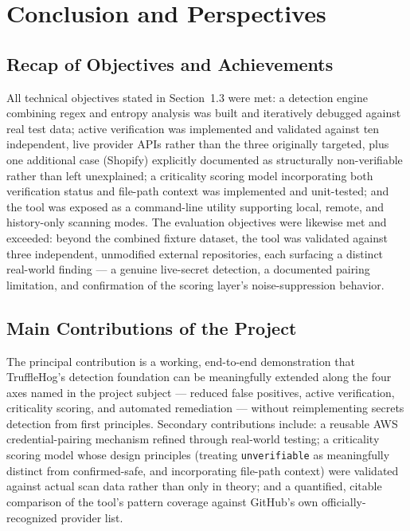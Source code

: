 \documentclass[12pt]{article}
\begin{document}
\newpage

\section{Conclusion and Perspectives}

\subsection{Recap of Objectives and Achievements}

All technical objectives stated in Section~1.3 were met: a detection engine combining regex and entropy analysis was built and iteratively debugged against real test data; active verification was implemented and validated against ten independent, live provider APIs rather than the three originally targeted, plus one additional case (Shopify) explicitly documented as structurally non-verifiable rather than left unexplained; a criticality scoring model incorporating both verification status and file-path context was implemented and unit-tested; and the tool was exposed as a command-line utility supporting local, remote, and history-only scanning modes. The evaluation objectives were likewise met and exceeded: beyond the combined fixture dataset, the tool was validated against three independent, unmodified external repositories, each surfacing a distinct real-world finding --- a genuine live-secret detection, a documented pairing limitation, and confirmation of the scoring layer's noise-suppression behavior.

\subsection{Main Contributions of the Project}

The principal contribution is a working, end-to-end demonstration that TruffleHog's detection foundation can be meaningfully extended along the four axes named in the project subject --- reduced false positives, active verification, criticality scoring, and automated remediation --- without reimplementing secrets detection from first principles. Secondary contributions include: a reusable AWS credential-pairing mechanism refined through real-world testing; a criticality scoring model whose design principles (treating \texttt{unverifiable} as meaningfully distinct from confirmed-safe, and incorporating file-path context) were validated against actual scan data rather than only in theory; and a quantified, citable comparison of the tool's pattern coverage against GitHub's own officially-recognized provider list.
\end{document}

